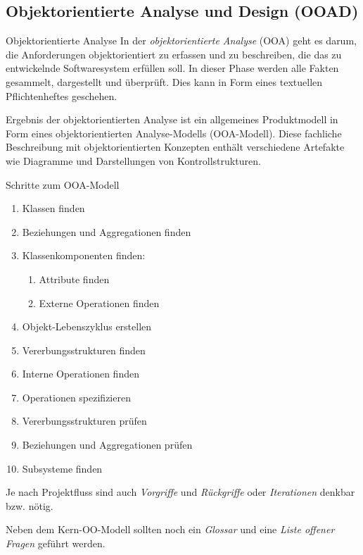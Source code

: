 \subsection{Objektorientierte Analyse und Design (OOAD)}

\begin{defi}{Objektorientierte Analyse}
    In der \emph{objektorientierte Analyse} (OOA) geht es darum, die Anforderungen objektorientiert zu erfassen und zu beschreiben, die das zu entwickelnde Softwaresystem erfüllen soll.
    In dieser Phase werden alle Fakten gesammelt, dargestellt und überprüft.
    Dies kann in Form eines textuellen Pflichtenheftes geschehen.

    Ergebnis der objektorientierten Analyse ist ein allgemeines Produktmodell in Form eines objektorientierten Analyse-Modells (OOA-Modell).
    Diese fachliche Beschreibung mit objektorientierten Konzepten enthält verschiedene Artefakte wie Diagramme und Darstellungen von Kontrollstrukturen.
\end{defi}

\begin{defi}{Schritte zum OOA-Modell}
    \begin{enumerate}
        \item Klassen finden
        \item Beziehungen und Aggregationen finden
        \item Klassenkomponenten finden:
              \begin{enumerate}
                  \item Attribute finden
                  \item Externe Operationen finden
              \end{enumerate}
        \item Objekt-Lebenszyklus erstellen
        \item Vererbungsstrukturen finden
        \item Interne Operationen finden
        \item Operationen spezifizieren
        \item Vererbungsstrukturen prüfen
        \item Beziehungen und Aggregationen prüfen
        \item Subsysteme finden
    \end{enumerate}

    Je nach Projektfluss sind auch \emph{Vorgriffe} und \emph{Rückgriffe} oder \emph{Iterationen} denkbar bzw. nötig.

    Neben dem Kern-OO-Modell sollten noch ein \emph{Glossar} und eine \emph{Liste offener Fragen} geführt werden.
\end{defi}

